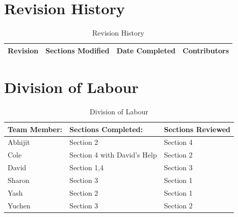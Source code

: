 \documentclass[12pt]{article}
\begin{document}
\newpage

\FloatBarrier
\appendix
\section{Revision History}
\begin{table}[ht]
	\centering
	\begin{tabular}{|p{2cm}|p{5cm}|p{3cm}|p{3cm}|}
		\hline
		\textbf{Revision} & \textbf{Sections Modified} & \textbf{Date Completed} & \textbf{Contributors}\\
		\hline
	\end{tabular}
	\caption{Revision History}
	\label{table:1}
\end{table}
\section{Division of Labour}
\label{sec:division_of_labour}
\begin{table}[ht]
	\centering
	\begin{tabular}{|p{2cm}|p{5cm}|p{5cm}|}
		\hline
		\textbf{Team Member:} & \textbf{Sections Completed:} & \textbf{Sections Reviewed}\\
		\hline
		Abhijit & Section 2 & Section 4\\
		\hline
		Cole & Section 4 with David's Help & Section 2\\
		\hline
		David & Section 1,4 & Section 3\\
		\hline
		Sharon & Section 3 & Section 1\\
		\hline
		Yash & Section 2 & Section 1\\
		\hline
		Yuchen & Section 3 & Section 2\\
		\hline
	\end{tabular}
	\caption{Division of Labour}
	\label{table:1}
\end{table}
\end{document}
